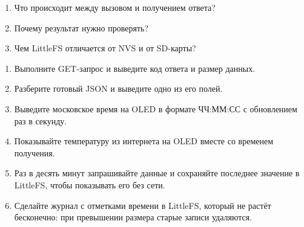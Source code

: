 \begin{selfcheck}
\begin{enumerate}
  \item Что происходит между вызовом  и получением ответа?
  \item Почему результат  нужно проверять?
  \item Чем LittleFS отличается от NVS и от SD-карты?
\end{enumerate}
\end{selfcheck}

\begin{tasks}
\begin{enumerate}
\item {} Выполните GET-запрос и выведите код ответа и размер данных.
\item {} Разберите готовый JSON и выведите одно из его полей.
\item {} Выведите московское время на OLED в формате ЧЧ:ММ:СС с обновлением раз в секунду.
\item {} Показывайте температуру из интернета на OLED вместе со временем получения.
\item {} Раз в десять минут запрашивайте данные и сохраняйте последнее значение в LittleFS, чтобы показывать его без сети.
\item {} Сделайте журнал с отметками времени в LittleFS, который не растёт бесконечно: при превышении размера старые записи удаляются.
\end{enumerate}
\end{tasks}
